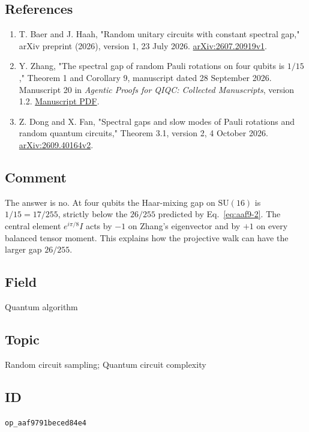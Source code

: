 \subsection*{References}

\begin{enumerate}[label={},leftmargin=4.8em,labelsep=0.5em]
  \footnotesize
  \item[\textup{[Baer26]}]\label{ref:aaf9-baer26}
  T. Baer and J. Haah, "Random unitary circuits with constant spectral gap," arXiv preprint (2026), version 1, 23 July 2026. \href{https://arxiv.org/abs/2607.20919v1}{arXiv:2607.20919v1}.

  \item[\textup{[Zha26]}]\label{ref:aaf9-zhang26}
  Y. Zhang, "The spectral gap of random Pauli rotations on four qubits is $1/15$," Theorem 1 and Corollary 9, manuscript dated 28 September 2026. Manuscript 20 in \emph{Agentic Proofs for QIQC: Collected Manuscripts}, version 1.2. \href{https://zenodo.org/records/23032999/files/pauli-rotation-gap.pdf}{Manuscript PDF}.

  \item[\textup{[DF26]}]\label{ref:aaf9-dong-fan26}
  Z. Dong and X. Fan, "Spectral gaps and slow modes of Pauli rotations and random quantum circuits," Theorem 3.1, version 2, 4 October 2026. \href{https://arxiv.org/abs/2609.40164v2}{arXiv:2609.40164v2}.
\end{enumerate}

\subsection*{Comment}

The answer is no. At four qubits the Haar-mixing gap on $\mathrm{SU}(16)$ is $1/15=17/255$, strictly below the $26/255$ predicted by Eq.~\eqref{eq:aaf9-2}. The central element $e^{i\pi/8}I$ acts by $-1$ on Zhang's eigenvector and by $+1$ on every balanced tensor moment. This explains how the projective walk can have the larger gap $26/255$.  

\subsection*{Field}

Quantum algorithm

\subsection*{Topic}

Random circuit sampling; Quantum circuit complexity

\subsection*{ID}

\texttt{op\_aaf9791beced84e4}
